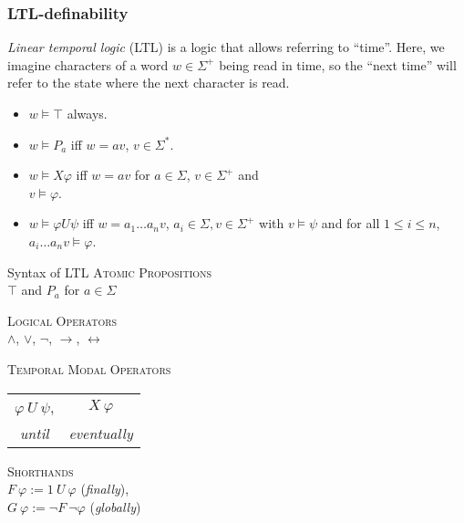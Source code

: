 \documentclass[english]{panikzettel}
\begin{document}

\subsubsection{LTL-definability}
\label{sssec:ltl}
\begin{halfboxl}
    \emph{Linear temporal logic} (LTL) is a logic that allows referring to ``time''.
    Here, we imagine characters of a word $w \in \Sigma^+$ being read in time, so the ``next time'' will refer to the state where the next character is read.

    \begin{itemize}[leftmargin=*]
        \item $w \models \top$ always.
        \item $w \models P_a$ iff $w = av$, $v \in \Sigma^\ast$.
        \item $w \models X\varphi$ iff $w = av$ for $a \in \Sigma$, $v \in \Sigma^+$ and \\
                $v \models \varphi$.
        \item $w \models \varphi U \psi$ iff $w = a_1\ldots a_n v$, $a_i \in \Sigma, v \in \Sigma^+$ with $v \models \psi$ and for all $1 \le i \le n$, $a_i\ldots a_n v \models \varphi$.
    \end{itemize}
\end{halfboxl}%
\begin{halfboxr}
    \vspace{-\baselineskip}
    \begin{defi}{Syntax of LTL}
        \centering
        \textsc{Atomic Propositions} \\
        $\top$ and $P_a$ for $a \in \Sigma$

        \textsc{Logical Operators} \\
        $\land$, $\lor$, $\neg$, $\rightarrow$, $\leftrightarrow$

        \textsc{Temporal Modal Operators} \\
        \begin{tabular}{cc}
            $\varphi ~U~ \psi$, & $X~\varphi$ \\
            \emph{until} & \emph{eventually}
        \end{tabular}

        \textsc{Shorthands} \\
        $F~\varphi := 1~U~\varphi$ (\emph{finally}), \\
        $G~\varphi := \neg F~ \neg \varphi$ (\emph{globally})
    \end{defi}
\end{halfboxr}
\end{document}
